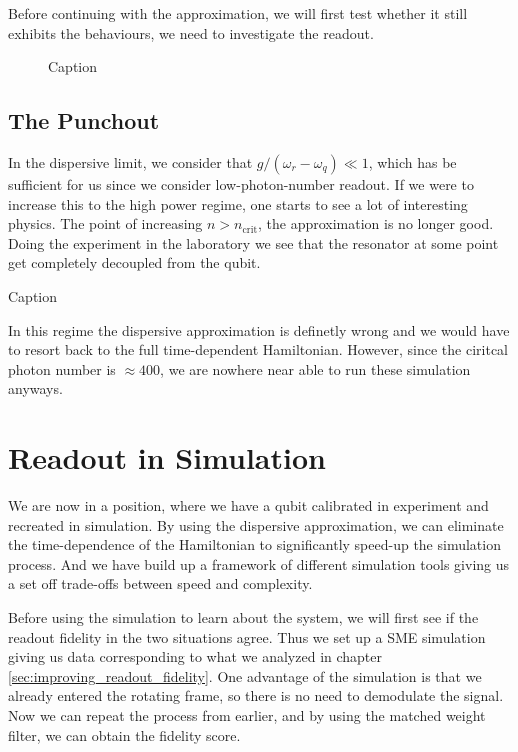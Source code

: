 Before continuing with the approximation, we will first test whether it still exhibits the behaviours, we need to investigate the readout. 

\begin{figure}
    \centering
    \caption{Caption}
    \label{fig:enter-label}
\end{figure}

\subsection{The Punchout}
In the dispersive limit, we consider that $g/(\omega_r - \omega_q) \ll 1$, which has be sufficient for us since we consider low-photon-number readout. If we were to increase this to the high power regime, one starts to see a lot of interesting physics. The point of increasing $n > n_{\text{crit}}$, the approximation is no longer good. Doing the experiment in the laboratory we see that the resonator at some point get completely decoupled from the qubit.

\begin{marginfigure}
    \centering
    \caption{Caption}
    \label{fig:experiment_punchout}
\end{marginfigure}

In this regime the dispersive approximation is definetly wrong and we would have to resort back to the full time-dependent Hamiltonian. However, since the ciritcal photon number is $\approx 400$, we are nowhere near able to run these simulation anyways. 

\section{Readout in Simulation}
We are now in a position, where we have a qubit calibrated in experiment and recreated in simulation. By using the dispersive approximation, we can eliminate the time-dependence of the Hamiltonian to significantly speed-up the simulation process. And we have build up a framework of different simulation tools giving us a set off trade-offs between speed and complexity. 

Before using the simulation to learn about the system, we will first see if the readout fidelity in the two situations agree. Thus we set up a SME simulation giving us data corresponding to what we analyzed in chapter \ref{sec:improving_readout_fidelity}. One advantage of the simulation is that we already entered the rotating frame, so there is no need to demodulate the signal. Now we can repeat the process from earlier, and by using the matched weight filter, we can obtain the fidelity score.

